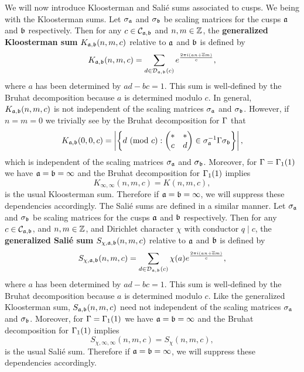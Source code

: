     We will now introduce Kloosterman and Sali\'e sums associated to cusps. We being with the Kloosterman sums. Let $\sigma_{\mathfrak{a}}$ and $\sigma_{\mathfrak{b}}$ be scaling matrices for the cusps $\mathfrak{a}$ and $\mathfrak{b}$ respectively. Then for any $c \in \mathcal{C}_{\mathfrak{a},\mathfrak{b}}$ and $n,m \in \mathbb{Z}$, the \textbf{generalized Kloosterman sum} $K_{\mathfrak{a},\mathfrak{b}}(n,m,c)$ relative to $\mathfrak{a}$ and $\mathfrak{b}$ is defined by
    \[
      K_{\mathfrak{a},\mathfrak{b}}(n,m,c) = \sum_{d \in \mathcal{D}_{\mathfrak{a},\mathfrak{b}}(c)}e^{\frac{2\pi i(an+\overline{a}m)}{c}},
    \]
    where $a$ has been determined by $ad-bc = 1$. This sum is well-defined by the Bruhat decomposition because $a$ is determined modulo $c$. In general, $K_{\mathfrak{a},\mathfrak{b}}(n,m,c)$ is not independent of the scaling matrices $\sigma_{\mathfrak{a}}$ and $\sigma_{\mathfrak{b}}$. However, if $n = m = 0$ we trivially see by the Bruhat decomposition for $\Gamma$ that
    \[
      K_{\mathfrak{a},\mathfrak{b}}(0,0,c) = \left|\left\{d \ (\mathrm{mod}\text{ }c):\begin{pmatrix} \ast & \ast \\ c & d \end{pmatrix} \in \sigma_{\mathfrak{a}}^{-1}\Gamma\sigma_{\mathfrak{b}}\right\}\right|,
    \]
    which is independent of the scaling matrices $\sigma_{\mathfrak{a}}$ and $\sigma_{\mathfrak{b}}$. Moreover, for $\Gamma = \Gamma_{1}(1)$ we have $\mathfrak{a} = \mathfrak{b} = \infty$ and the Bruhat decomposition for $\Gamma_{1}(1)$ implies
    \[
      K_{\infty,\infty}(n,m,c) = K(n,m,c),
    \]
    is the usual Kloosterman sum. Therefore if $\mathfrak{a} = \mathfrak{b} = \infty$, we will suppress these dependencies accordingly. The Sali\'e sums are defined in a similar manner. Let $\sigma_{\mathfrak{a}}$ and $\sigma_{\mathfrak{b}}$ be scaling matrices for the cusps $\mathfrak{a}$ and $\mathfrak{b}$ respectively. Then for any $c \in \mathcal{C}_{\mathfrak{a},\mathfrak{b}}$, and $n,m \in \mathbb{Z}$, and Dirichlet character $\chi$ with conductor $q \mid c$, the \textbf{generalized Sali\'e sum} $S_{\chi,\mathfrak{a},\mathfrak{b}}(n,m,c)$ relative to $\mathfrak{a}$ and $\mathfrak{b}$ is defined by
    \[
      S_{\chi,\mathfrak{a},\mathfrak{b}}(n,m,c) = \sum_{d \in \mathcal{D}_{\mathfrak{a},\mathfrak{b}}(c)}\chi(a)e^{\frac{2\pi i(an+\overline{a}m)}{c}},
    \]
    where $a$ has been determined by $ad-bc = 1$. This sum is well-defined by the Bruhat decomposition because $a$ is determined modulo $c$. Like the generalized Kloosterman sum, $S_{\mathfrak{a},\mathfrak{b}}(n,m,c)$ need not independent of the scaling matrices $\sigma_{\mathfrak{a}}$ and $\sigma_{\mathfrak{b}}$. Moreover, for $\Gamma = \Gamma_{1}(1)$ we have $\mathfrak{a} = \mathfrak{b} = \infty$ and the Bruhat decomposition for $\Gamma_{1}(1)$ implies
    \[
      S_{\chi,\infty,\infty}(n,m,c) = S_{\chi}(n,m,c),
    \]
    is the usual Sali\'e sum. Therefore if $\mathfrak{a} = \mathfrak{b} = \infty$, we will suppress these dependencies accordingly.
